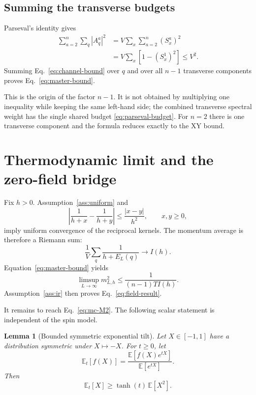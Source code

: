 \documentclass[aps,prb,twocolumn,groupedaddress,amsmath,amssymb,
               superscriptaddress,nofootinbib,floatfix]{revtex4-2}
\theoremstyle{plain}
\newtheorem{lemma}{Lemma}
\theoremstyle{definition}
\newcommand{\Exp}{\mathbb E}
\begin{document}
\subsection{Summing the transverse budgets}

Parseval's identity gives
\begin{align}
 \sum_{a=2}^n\sum_q|A_q^a|^2
 &=
 V\sum_x\sum_{a=2}^n(S_x^a)^2 \nonumber\\
 &=
 V\sum_x[1-(S_x^1)^2]\le V^2.                         \label{eq:parseval-budget}
\end{align}
Summing Eq.~\eqref{eq:channel-bound} over $q$ and over all $n-1$
transverse components proves Eq.~\eqref{eq:master-bound}.

This is the origin of the factor $n-1$.  It is not obtained by multiplying
one inequality while keeping the same left-hand side; the combined
transverse spectral weight has the single shared budget
\eqref{eq:parseval-budget}.  For $n=2$ there is one transverse component and
the formula reduces exactly to the XY bound.

\section{Thermodynamic limit and the zero-field bridge}
\label{sec:bridge}

Fix $h>0$.  Assumption~\ref{ass:uniform} and
\begin{equation}
 \left|\frac1{h+x}-\frac1{h+y}\right|
 \le\frac{|x-y|}{h^2},\qquad x,y\ge0,                  \label{eq:reciprocal-lipschitz}
\end{equation}
imply uniform convergence of the reciprocal kernels.  The momentum average
is therefore a Riemann sum:
\begin{equation}
 \frac1V\sum_q\frac1{h+E_L(q)}
 \longrightarrow I(h).                                \label{eq:riemann}
\end{equation}
Equation~\eqref{eq:master-bound} yields
\begin{equation}
 \limsup_{L\to\infty}m_{L,h}^2
 \le\frac1{(n-1)T I(h)}.                               \label{eq:regulated-bound}
\end{equation}
Assumption~\ref{ass:ir} then proves Eq.~\eqref{eq:field-result}.

It remains to reach Eq.~\eqref{eq:mc-M2}.  The following scalar statement is
independent of the spin model.

\begin{lemma}[Bounded symmetric exponential tilt]
\label{lem:tilt}
Let $X\in[-1,1]$ have a distribution symmetric under $X\mapsto-X$.  For
$t\ge0$, let
\begin{equation}
 \Exp_t[f(X)]
 =
 \frac{\Exp[f(X)e^{tX}]}{\Exp[e^{tX}]}.
\end{equation}
Then
\begin{equation}
 \Exp_t[X]\ge\tanh(t)\,\Exp[X^2].                      \label{eq:tilt}
\end{equation}
\end{lemma}
\end{document}
